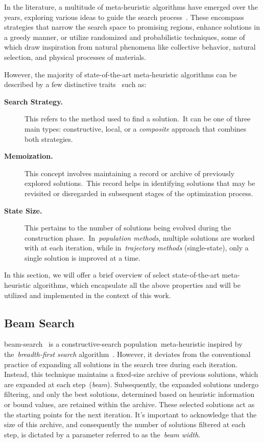 In the literature, a multitude of meta-heuristic algorithms have emerged over
the years, exploring various ideas to guide the search
process~\cite{osman1996metaheuristics}. These encompass strategies that narrow
the search space to promising regions, enhance solutions in a greedy manner, or
utilize randomized and probabilistic techniques, some of which draw inspiration
from natural phenomena like collective behavior, natural selection, and physical
processes of materials.

However, the majority of state-of-the-art meta-heuristic algorithms can be
described by a few distinctive traits~\cite{blum2003metaheuristics} such as:

\begin{description}
  \item[\textbf{Search Strategy.}] This refers to the method used to find a
    solution.~It can be one of three main types: constructive, local, or a
    \emph{composite} approach that combines both strategies.

  \item[\textbf{Memoization.}] This concept involves maintaining a record or
    archive of previously explored solutions.~This record helps in identifying
    solutions that may be revisited or disregarded in subsequent stages of the
    optimization process.

  \item[\textbf{State Size.}] This pertains to the number of solutions being
    evolved during the construction phase.~In~\emph{population methods}, multiple
    solutions are worked with at each iteration, while in~\emph{trajectory methods} (single-state),
    only a single solution is improved at a time.
\end{description}

In this section, we will offer a brief overview of select state-of-the-art
\acrshort{meta-heuristic} algorithms, which encapsulate all the above properties
and will be utilized and implemented in the context of this work.

\subsection{Beam Search}
\label{subsec:beam-search}

\acrfull{beam-search}~\cite{ow1988filtered,outeiro2021application} is a
\acrshort{constructive-search} population~\acrfull{meta-heuristic} inspired by
the~\emph{breadth-first search} algorithm~\cite{papadimitriou1998combinatorial}.
However, it deviates from the conventional practice of expanding all solutions
in the search tree during each iteration. Instead, this technique maintains a
fixed-size archive of previous solutions, which are expanded at each
step~(\textit{beam}). Subsequently, the expanded solutions undergo filtering,
and only the best solutions, determined based on heuristic information or bound
values, are retained within the archive. These selected solutions act as the
starting points for the next iteration. It's important to acknowledge that the
size of this archive, and consequently the number of solutions filtered at each
step, is dictated by a parameter referred to as the~\emph{beam width}.

